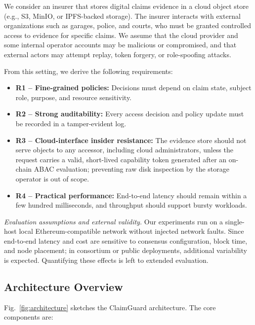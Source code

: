 \documentclass[conference]{IEEEtran}
\begin{document}
We consider an insurer that stores digital claims evidence in a cloud object store (e.g., S3, MinIO, or IPFS-backed storage). 
The insurer interacts with external organizations such as garages, police, and courts, who must be granted controlled access to evidence for specific claims.
We assume that the cloud provider and some internal operator accounts may be malicious or compromised, and that external actors may attempt replay, token forgery, or role-spoofing attacks.

From this setting, we derive the following requirements:
\begin{itemize}
    \item \textbf{R1 -- Fine-grained policies:} Decisions must depend on claim state, subject role, purpose, and resource sensitivity.
    \item \textbf{R2 -- Strong auditability:} Every access decision and policy update must be recorded in a tamper-evident log.
    \item \textbf{R3 -- Cloud-interface insider resistance:} The evidence store should not serve objects to any accessor, including cloud administrators, unless the request carries a valid, short-lived capability token generated after an on-chain ABAC evaluation; preventing raw disk inspection by the storage operator is out of scope.
    \item \textbf{R4 -- Practical performance:} End-to-end latency should remain within a few hundred milliseconds, and throughput should support bursty workloads.
\end{itemize}

\noindent\textit{Evaluation assumptions and external validity.} Our experiments run on a single-host local Ethereum-compatible network without injected network faults. Since end-to-end latency and cost are sensitive to consensus configuration, block time, and node placement; in consortium or public deployments, additional variability is expected. Quantifying these effects is left to extended evaluation.

\subsection{Architecture Overview}

Fig.~\ref{fig:architecture} sketches the ClaimGuard architecture.
The core components are:
\end{document}
